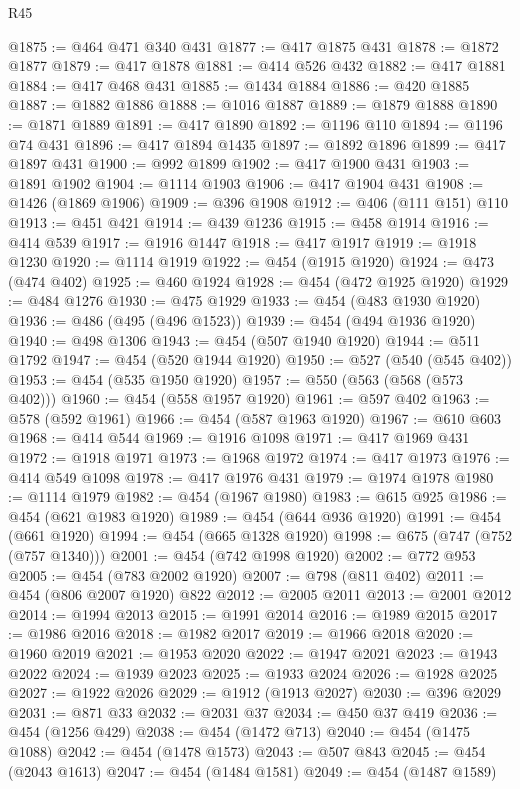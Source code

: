\begin{lexlean}{R45}
\begin{coremodule}
{{{{{{{{{{{{{{{{{{{{{{{{{{{{{{{{{{{{{{{{{{{{{{{{{{{{{{{{{{{{{{{{{{{{{{{{{{{{{{{{{{{{{{{{{{{@1875 := @464 @471 @340 @431
@1877 := @417 @1875 @431
@1878 := @1872 @1877
@1879 := @417 @1878
@1881 := @414 @526 @432
@1882 := @417 @1881
@1884 := @417 @468 @431
@1885 := @1434 @1884
@1886 := @420 @1885
@1887 := @1882 @1886
@1888 := @1016 @1887
@1889 := @1879 @1888
@1890 := @1871 @1889
@1891 := @417 @1890
@1892 := @1196 @110
@1894 := @1196 @74 @431
@1896 := @417 @1894 @1435
@1897 := @1892 @1896
@1899 := @417 @1897 @431
@1900 := @992 @1899
@1902 := @417 @1900 @431
@1903 := @1891 @1902
@1904 := @1114 @1903
@1906 := @417 @1904 @431
@1908 := @1426 (@1869 @1906)
@1909 := @396 @1908
@1912 := @406 (@111 @151) @110
@1913 := @451 @421
@1914 := @439 @1236
@1915 := @458 @1914
@1916 := @414 @539
@1917 := @1916 @1447
@1918 := @417 @1917
@1919 := @1918 @1230
@1920 := @1114 @1919
@1922 := @454 (@1915 @1920)
@1924 := @473 (@474 @402)
@1925 := @460 @1924
@1928 := @454 (@472 @1925 @1920)
@1929 := @484 @1276
@1930 := @475 @1929
@1933 := @454 (@483 @1930 @1920)
@1936 := @486 (@495 (@496 @1523))
@1939 := @454 (@494 @1936 @1920)
@1940 := @498 @1306
@1943 := @454 (@507 @1940 @1920)
@1944 := @511 @1792
@1947 := @454 (@520 @1944 @1920)
@1950 := @527 (@540 (@545 @402))
@1953 := @454 (@535 @1950 @1920)
@1957 := @550 (@563 (@568 (@573 @402)))
@1960 := @454 (@558 @1957 @1920)
@1961 := @597 @402
@1963 := @578 (@592 @1961)
@1966 := @454 (@587 @1963 @1920)
@1967 := @610 @603
@1968 := @414 @544
@1969 := @1916 @1098
@1971 := @417 @1969 @431
@1972 := @1918 @1971
@1973 := @1968 @1972
@1974 := @417 @1973
@1976 := @414 @549 @1098
@1978 := @417 @1976 @431
@1979 := @1974 @1978
@1980 := @1114 @1979
@1982 := @454 (@1967 @1980)
@1983 := @615 @925
@1986 := @454 (@621 @1983 @1920)
@1989 := @454 (@644 @936 @1920)
@1991 := @454 (@661 @1920)
@1994 := @454 (@665 @1328 @1920)
@1998 := @675 (@747 (@752 (@757 @1340)))
@2001 := @454 (@742 @1998 @1920)
@2002 := @772 @953
@2005 := @454 (@783 @2002 @1920)
@2007 := @798 (@811 @402)
@2011 := @454 (@806 @2007 @1920) @822
@2012 := @2005 @2011
@2013 := @2001 @2012
@2014 := @1994 @2013
@2015 := @1991 @2014
@2016 := @1989 @2015
@2017 := @1986 @2016
@2018 := @1982 @2017
@2019 := @1966 @2018
@2020 := @1960 @2019
@2021 := @1953 @2020
@2022 := @1947 @2021
@2023 := @1943 @2022
@2024 := @1939 @2023
@2025 := @1933 @2024
@2026 := @1928 @2025
@2027 := @1922 @2026
@2029 := @1912 (@1913 @2027)
@2030 := @396 @2029
@2031 := @871 @33
@2032 := @2031 @37
@2034 := @450 @37 @419
@2036 := @454 (@1256 @429)
@2038 := @454 (@1472 @713)
@2040 := @454 (@1475 @1088)
@2042 := @454 (@1478 @1573)
@2043 := @507 @843
@2045 := @454 (@2043 @1613)
@2047 := @454 (@1484 @1581)
@2049 := @454 (@1487 @1589)
}}}}}}}}}}}}}}}}}}}}}}}}}}}}}}}}}}}}}}}}}}}}}}}}}}}}}}}}}}}}}}}}}}}}}}}}}}}}}}}}}}}}}}}}}}}
\end{coremodule}
\end{lexlean}
